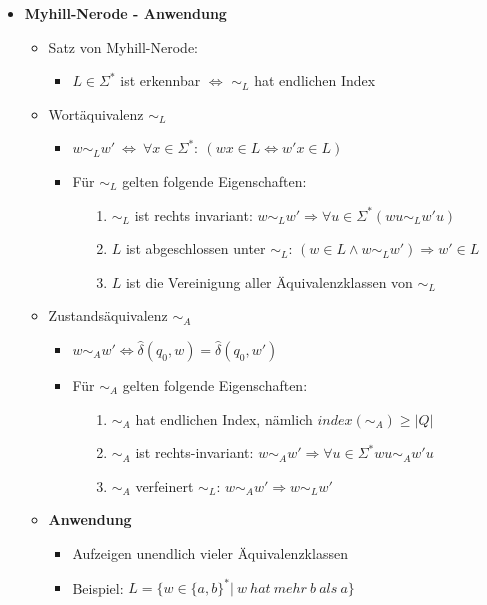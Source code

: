\documentclass[11pt,a4paper]{article}
\begin{document}
\begin{itemize}
\item {\large \textbf{Myhill-Nerode - Anwendung}}
	\begin{itemize}
	\item Satz von Myhill-Nerode:
		\begin{itemize}
		\item $L \in \Sigma^*$ ist erkennbar $\Leftrightarrow$ $\sim_L$ hat endlichen Index
		\end{itemize}
	\item Wortäquivalenz $\sim_L$
		\begin{itemize}
		\item $w \sim_L w'~\Leftrightarrow~ \forall x \in \Sigma^*:~(wx \in L \Leftrightarrow w'x \in L)$
		\item Für $\sim_L$ gelten folgende Eigenschaften:
			\begin{itemize}
			\item[1.] $\sim_L$ ist rechts invariant: $w \sim_L w' \Rightarrow \forall u \in \Sigma^* (wu \sim_L w'u)$
			\item[2.] $L$ ist abgeschlossen unter $\sim_L$: $(w\in L \land w \sim_L w') \Rightarrow w' \in L$
			\item[3.] $L$ ist die Vereinigung aller Äquivalenzklassen von $\sim_L$
			\end{itemize}
		\end{itemize}
	\item Zustandsäquivalenz $\sim_A$
		\begin{itemize}
		\item $w \sim_A w' \Leftrightarrow \hat{\delta}(q_0,w) = \hat{\delta}(q_0,w')$
		\item Für $\sim_A$ gelten folgende Eigenschaften:
			\begin{itemize}
			\item[1.]$\sim_A$ hat endlichen Index, nämlich $index(\sim_A) \geq |Q|$
			\item[2.]$\sim_A$ ist rechts-invariant: $w \sim_A w' \Rightarrow \forall u \in \Sigma^* wu \sim_A w'u$
			\item[3.]$\sim_A$ verfeinert $\sim_L$: $w\sim_A w' \Rightarrow w \sim_L w'$
			\end{itemize}
		\end{itemize}
	\item[]
	\item \textbf{Anwendung}
		\begin{itemize}
		\item Aufzeigen unendlich vieler Äquivalenzklassen 
		\item Beispiel: $L=\{w \in \{a,b\}^* |~w~hat~mehr~b~als~a\}$

\end{itemize}
\end{itemize}
\end{itemize}
\end{document}
